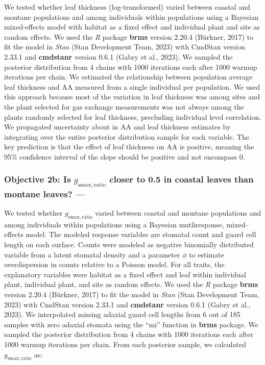 \documentclass[
  letterpaper,
  DIV=11,
  numbers=noendperiod]{scrartcl}
\begin{document}
We tested whether leaf thickness (log-transformed) varied between
coastal and montane populations and among individuals within populations
using a Bayesian mixed-effects model with habitat as a fixed effect and
individual plant and site as random effects. We used the \emph{R}
package \textbf{brms} version 2.20.4 (Bürkner, 2017) to fit the model in
\emph{Stan} (Stan Development Team, 2023) with CmdStan version 2.33.1
and \textbf{cmdstanr} version 0.6.1 (Gabry et al., 2023). We sampled the
posterior distribution from 4 chains with 1000 iterations each after
1000 warmup iterations per chain. We estimated the relationship between
population average leaf thickness and \(\mathrm{AA}\) measured from a
single individual per population. We used this approach because most of
the variation in leaf thickness was among sites and the plant selected
for gas exchange measurements was not always among the plants randomly
selected for leaf thickness, precluding individual level correlation. We
propagated uncertainty about in \(\mathrm{AA}\) and leaf thickness
estimates by integrating over the entire posterior distribution sample
for each variable. The key prediction is that the effect of leaf
thickness on \(\mathrm{AA}\) is positive, meaning the 95\% confidence
interval of the slope should be positive and not encompass 0.

\hypertarget{objective-2b-is-g_mathrmsmaxratio-closer-to-0.5-in-coastal-leaves-than-montane-leaves}{%
\subsubsection{\texorpdfstring{Objective 2b: Is
\(g_{\mathrm{smax,ratio}}\) closer to 0.5 in coastal leaves than montane
leaves?
---}{Objective 2b: Is g\_\{\textbackslash mathrm\{smax,ratio\}\} closer to 0.5 in coastal leaves than montane leaves? ---}}\label{objective-2b-is-g_mathrmsmaxratio-closer-to-0.5-in-coastal-leaves-than-montane-leaves}}

We tested whether \(g_\mathrm{smax,ratio}\) varied between coastal and
montane populations and among individuals within populations using a
Bayesian mutliresponse, mixed-effects model. The modeled response
variables are stomatal count and guard cell length on each surface.
Counts were modeled as negative binomially distributed variable from a
latent stomatal density and a parameter \(\phi\) to estimate
overdispersion in counts relative to a Poisson model. For all traits,
the explanatory variables were habitat as a fixed effect and leaf within
individual plant, individual plant, and site as random effects. We used
the \emph{R} package \textbf{brms} version 2.20.4 (Bürkner, 2017) to fit
the model in \emph{Stan} (Stan Development Team, 2023) with CmdStan
version 2.33.1 and \textbf{cmdstanr} version 0.6.1 (Gabry et al., 2023).
We interpolated missing adaxial guard cell lengths from 6 out of 185
samples with zero adaxial stomata using the ``mi'' function in
\textbf{brms} package. We sampled the posterior distribution from 4
chains with 1000 iterations each after 1000 warmup iterations per chain.
From each posterior sample, we calculated \(g_{\mathrm{smax,ratio}}\)
as:
\end{document}
